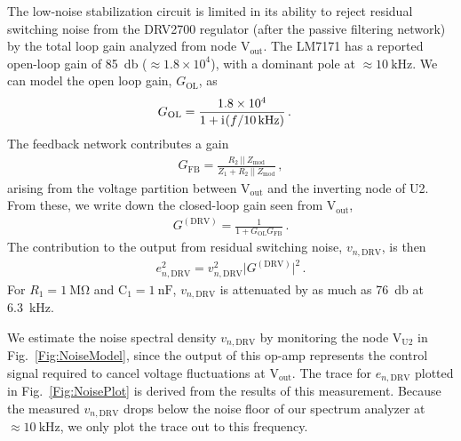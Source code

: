 \documentclass[aip,rsi,reprint]{revtex4-1} %
\newcommand{\iu}{\mathrm{i}\mkern1mu}
\begin{document}
The low-noise stabilization circuit is limited in its ability to reject residual switching noise from the DRV2700 regulator (after the passive filtering network) by the total loop gain analyzed from node $\text{V}_\text{out}$.
The LM7171 has a reported open-loop gain of \SI{85}{\decibel} ($\approx 1.8\times 10^4$), with a dominant pole at $\approx\SI{10}{\kilo\hertz}$.\cite{LM7171Datasheet}
We can model the open loop gain, $G_\text{OL}$, as
\begin{align}
G_\text{OL} &= \frac{1.8\times10^4}{1 + \iu (f/\SI{10}{\kilo\hertz})}\,.
\end{align}
The feedback network contributes a gain
\begin{align}
G_\text{FB} = \frac{R_2~||~Z_\text{mod}}{Z_1 + R_2~||~Z_\text{mod}}\,,
\end{align}
arising from the voltage partition between $\text{V}_\text{out}$ and the inverting node of U2.
From these, we write down the closed-loop gain seen from $\text{V}_\text{out}$,
\begin{align}
G^{(\text{DRV})} = \frac{1}{1+G_\text{OL} G_\text{FB}}\,.
\end{align}
The contribution to the output from residual switching noise, $v_{n,\text{DRV}}$, is then
\begin{align}
e^2_{n,\text{DRV}} = v^2_{n,\text{DRV}}\big|G^{(\text{DRV})}\big|^2\,.
\end{align}
For $R_1=\SI{1}{\mega\ohm}$ and $\text{C}_1 = \SI{1}{\nano\farad}$, $v_{n,\text{DRV}}$ is attenuated by as much as \SI{76}{\decibel} at \SI{6.3}{\kilo\hertz}.

We estimate the noise spectral density $v_{n,\text{DRV}}$ by monitoring the node $\text{V}_\text{U2}$ in Fig.~\ref{Fig:NoiseModel}, since the output of this op-amp represents the control signal required to cancel voltage fluctuations at $\text{V}_\text{out}$.
The trace for $e_{n,\text{DRV}}$ plotted in Fig.~\ref{Fig:NoisePlot} is derived from the results of this measurement.
Because the measured $v_{n,\text{DRV}}$ drops below the noise floor of our spectrum analyzer at $\approx \SI{10}{\kilo\hertz}$, we only plot the trace out to this frequency.
\end{document}
